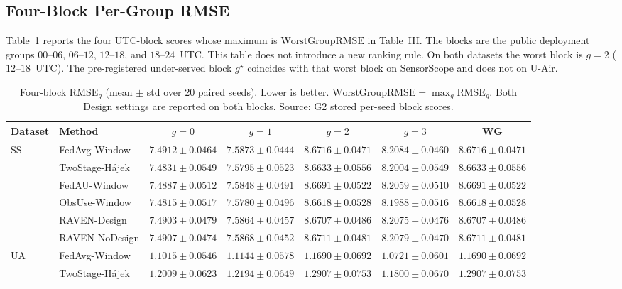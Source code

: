 \subsection{Four-Block Per-Group RMSE}
\label{app:block_rmse}

Table~\ref{tab:app_block_rmse} reports the four UTC-block scores whose
maximum is $\mathrm{WorstGroupRMSE}$ in
Table~III.  The blocks are the public
deployment groups $00$--$06$, $06$--$12$, $12$--$18$, and $18$--$24$~UTC.
This table does not introduce a new ranking rule.  On both datasets the
worst block is $g=2$ ($12$--$18$~UTC).  The pre-registered under-served
block $g^{\star}$ coincides with that worst block on SensorScope and
does not on U-Air.

\begin{table}[t]
\centering
\caption{Four-block $\mathrm{RMSE}_g$ (mean $\pm$ std over 20 paired
seeds).  Lower is better.  $\mathrm{WorstGroupRMSE}=\max_g\mathrm{RMSE}_g$.
Both Design settings are reported on both blocks.
Source: G2 stored per-seed block scores.}
\label{tab:app_block_rmse}
\footnotesize
\setlength{\tabcolsep}{4pt}
\begin{tabular*}{\textwidth}{@{\extracolsep{\fill}}llccccc}
\toprule
Dataset & Method & $g{=}0$ & $g{=}1$ & $g{=}2$ & $g{=}3$ & WG\\
\midrule
\multirow{6}{*}{SS}
& FedAvg-Window & $7.4912{\pm}0.0464$ & $7.5873{\pm}0.0444$ & $8.6716{\pm}0.0471$ & $8.2084{\pm}0.0460$ & $8.6716{\pm}0.0471$\\
& TwoStage-H\'ajek & $7.4831{\pm}0.0549$ & $7.5795{\pm}0.0523$ & $8.6633{\pm}0.0556$ & $8.2004{\pm}0.0549$ & $8.6633{\pm}0.0556$\\
& FedAU-Window & $7.4887{\pm}0.0512$ & $7.5848{\pm}0.0491$ & $8.6691{\pm}0.0522$ & $8.2059{\pm}0.0510$ & $8.6691{\pm}0.0522$\\
& ObsUse-Window & $7.4815{\pm}0.0517$ & $7.5780{\pm}0.0496$ & $8.6618{\pm}0.0528$ & $8.1988{\pm}0.0516$ & $8.6618{\pm}0.0528$\\
& RAVEN-Design & $7.4903{\pm}0.0479$ & $7.5864{\pm}0.0457$ & $8.6707{\pm}0.0486$ & $8.2075{\pm}0.0476$ & $8.6707{\pm}0.0486$\\
& RAVEN-NoDesign & $7.4907{\pm}0.0474$ & $7.5868{\pm}0.0452$ & $8.6711{\pm}0.0481$ & $8.2079{\pm}0.0470$ & $8.6711{\pm}0.0481$\\
\midrule
\multirow{6}{*}{UA}
& FedAvg-Window & $1.1015{\pm}0.0546$ & $1.1144{\pm}0.0578$ & $1.1690{\pm}0.0692$ & $1.0721{\pm}0.0601$ & $1.1690{\pm}0.0692$\\
& TwoStage-H\'ajek & $1.2009{\pm}0.0623$ & $1.2194{\pm}0.0649$ & $1.2907{\pm}0.0753$ & $1.1800{\pm}0.0670$ & $1.2907{\pm}0.0753$\\

\end{tabular*}
\end{table}
